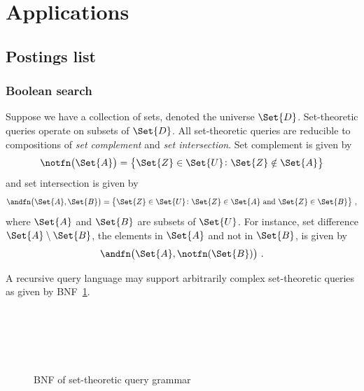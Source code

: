\documentclass[ ../main.tex]{subfiles}
\begin{document}
\section{Applications}
\label{sec:apps}
\subsection{Postings list}
\subsubsection{Boolean search}
Suppose we have a collection of sets, denoted the universe $\Set{D}$. Set-theoretic queries operate on subsets of $\Set{D}$. All set-theoretic queries are reducible to compositions of \emph{set complement} and \emph{set intersection}. Set complement is given by
\begin{equation}
    \notfn\!\left(\Set{A}\right) = \left\{\Set{Z} \in \Set{U} \colon \Set{Z} \notin \Set{A}\right\}
\end{equation}
and set intersection is given by
\begin{equation}
    \andfn\!\left(\Set{A}, \Set{B}\right) = \left\{\Set{Z} \in \Set{U} \colon \text{$\Set{Z} \in \Set{A}$ and $\Set{Z} \in \Set{B}$}\right\}\,,
\end{equation}
where $\Set{A}$ and $\Set{B}$ are subsets of $\Set{U}$. For instance, set difference $\Set{A} \setminus \Set{B}$, the elements in $\Set{A}$ and not in $\Set{B}$, is given by
\begin{equation}
    \andfn\!\left(\Set{A}, \notfn(\Set{B})\right)\,.
\end{equation}

A recursive query language may support arbitrarily complex set-theoretic queries as given by BNF~\ref{bnf:set_theoretic}.
\begin{figure}
\caption{BNF of set-theoretic query grammar}
\label{bnf:set_theoretic}
\begin{bnf*}
         \bnfor {} \bnfor {}\\
      \bnfts{(}\bnfts{)}\\
         \bnfts{(}\bnfts{,}\bnfts{)}\\
     \bnfts{$\notfn$} \bnfor \bnfsk\\
     \bnfts{$\andfn$} \bnfor \bnfts{$\orfn$} \bnfor \bnfts{$\diffn$} \bnfor \bnfsk
\end{bnf*}
\end{figure}
\end{document}

